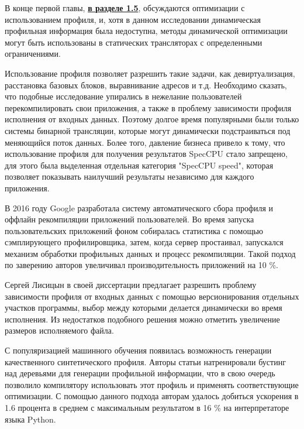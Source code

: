 В конце первой главы, \underline{\textbf{в разделе 1.5}}, обсуждаются оптимизации с использованием
профиля, и, хотя в данном исследовании динамическая профильная
информация была недоступна, методы динамической оптимизации могут быть
использованы в статических трансляторах с определенными ограничениями.  

 Использование профиля позволяет разрешить такие задачи, как девиртуализация, расстановка базовых блоков, выравнивание адресов и т.д. Необходимо сказать, что  подобные исследование упирались в нежелание пользователей перекомпилировать свои приложения, а также в проблему зависимости профиля исполнения от входных данных. Поэтому долгое  время популярными были только системы бинарной трансляции, которые могут динамически подстраиваться под меняющийся поток данных. Более того, давление бизнеса привело к тому, что использование профиля для получения результатов SpecCPU стало запрещено, для этого была выделенная отдельная категория "SpecCPU speed"\phantom{}, которая позволяет показывать наилучший результаты независимо для каждого приложения.
%	

В 2016 году Google разработала систему автоматического сбора профиля и оффлайн рекомпиляции приложений пользователей. Во время запуска пользовательских приложений фоном собиралась статистика с помощью сэмплирующего профилировщика, затем, когда сервер простаивал, запускался механизм обработки профильных данных и процесс рекомпиляции. Такой подход по заверению авторов увеличивал производительность приложений на 10 \%.  


Сергей Лисицын  в своей диссертации предлагает разрешить проблему зависимости профиля от входных данных с помощью версионирования отдельных участков программы, выбор между которыми делается динамически во время исполнения. Из недостатков подобного решения можно отметить увеличение размеров исполняемого файла.

С популяризацией машинного обучения появилась возможность генерации качественного синтетического профиля. Авторы статьи натренировали бустинг над деревьями для генерации профильной информации, что в свою очередь позволило компилятору использовать этот профиль и применять соответствующие оптимизации. С помощью данного подхода авторам удалось добиться ускорения в 1.6 процента в среднем с максимальным результатом в 16 \%  на интерпретаторе языка Python. 



